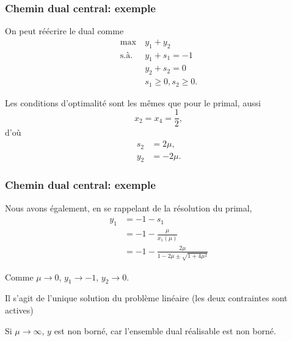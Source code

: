 \documentclass[usepdftitle=false, aspectratio=169]{beamer}
\begin{document}
\begin{frame}
\frametitle{Chemin dual central: exemple}

On peut réécrire le dual comme
\begin{align*}
\max\ & y_1 + y_2 \\
\mbox{s.à. } & y_1 + s_1 = -1 \\
& y_2 + s_2 = 0 \\
& s_1 \geq 0, s_2 \geq 0.
\end{align*}

\mbox{}

Les conditions d'optimalité sont les mêmes que pour le primal, aussi
\[
x_2 = x_4 = \frac{1}{2},
\]
d'où
\begin{align*}
s_2 &= 2\mu, \\
y_2 &= -2\mu.
\end{align*}

\end{frame}

\begin{frame}
\frametitle{Chemin dual central: exemple}

Nous avons également, en se rappelant de la résolution du primal,
\begin{align*}
y_1 & = -1 - s_1 \\
& = -1 - \frac{\mu}{x_1(\mu)} \\
& = -1 - \frac{2\mu}{1-2\mu\pm\sqrt{1+4\mu^2}}
\end{align*}

\mbox{}

Comme $\mu \rightarrow 0$, $y_1 \rightarrow -1$, $y_2 \rightarrow 0$.

\mbox{}

Il s'agit de l'unique solution du problème linéaire (les deux contraintes sont actives)

\mbox{}

Si $\mu \rightarrow \infty$, $y$ est non borné, car l'ensemble dual réalisable est non borné.

\end{frame}
\end{document}
